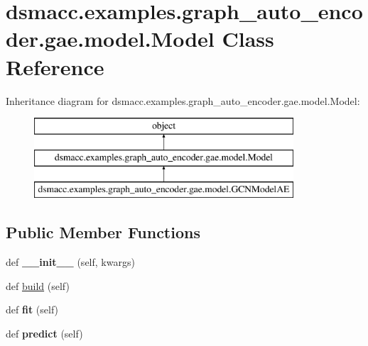 \hypertarget{classdsmacc_1_1examples_1_1graph__auto__encoder_1_1gae_1_1model_1_1Model}{}\section{dsmacc.\+examples.\+graph\+\_\+auto\+\_\+encoder.\+gae.\+model.\+Model Class Reference}
\label{classdsmacc_1_1examples_1_1graph__auto__encoder_1_1gae_1_1model_1_1Model}
Inheritance diagram for dsmacc.\+examples.\+graph\+\_\+auto\+\_\+encoder.\+gae.\+model.\+Model\+:\begin{figure}[H]
\begin{center}
\leavevmode
\includegraphics[height=3.000000cm]{classdsmacc_1_1examples_1_1graph__auto__encoder_1_1gae_1_1model_1_1Model}
\end{center}
\end{figure}
\subsection*{Public Member Functions}
\begin{DoxyCompactItemize}
\item 
\mbox{\label{classdsmacc_1_1examples_1_1graph__auto__encoder_1_1gae_1_1model_1_1Model_a841db6a74286a168b114a11da6742342}} 
def {\bfseries \+\_\+\+\_\+init\+\_\+\+\_\+} (self, kwargs)
\item 
def \mbox{\hyperlink{classdsmacc_1_1examples_1_1graph__auto__encoder_1_1gae_1_1model_1_1Model_a7725065430be8aac2d2ad1363f76d429}{build}} (self)
\item 
\mbox{\label{classdsmacc_1_1examples_1_1graph__auto__encoder_1_1gae_1_1model_1_1Model_aa70cdf8a3cbd698f20b6aee2984db0fc}} 
def {\bfseries fit} (self)
\item 
\mbox{\label{classdsmacc_1_1examples_1_1graph__auto__encoder_1_1gae_1_1model_1_1Model_a6d11e00c1cd728adcf3994f8fae4f387}} 
def {\bfseries predict} (self)
\end{DoxyCompactItemize}
